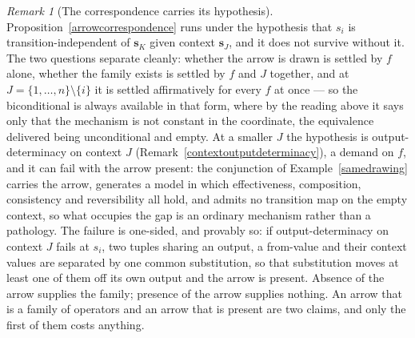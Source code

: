 \documentclass{article}
\theoremstyle{definition}
\theoremstyle{remark}
\newtheorem{remark}[proposition]{Remark}
\begin{document}
\begin{remark}[The correspondence carries its hypothesis]
\label{arrownotequivalence}
Proposition~\ref{arrowcorrespondence} runs under the hypothesis that $s_i$ is transition-independent of $\boldsymbol{s}_K$ given context $\boldsymbol{s}_J$, and it does not survive without it. The two questions separate cleanly: whether the arrow is drawn is settled by $f$ alone, whether the family exists is settled by $f$ and $J$ together, and at $J = \{1, \ldots, n\} \setminus \{i\}$ it is settled affirmatively for every $f$ at once --- so the biconditional is always available in that form, where by the reading above it says only that the mechanism is not constant in the coordinate, the equivalence delivered being unconditional and empty. At a smaller $J$ the hypothesis is output-determinacy on context $J$ (Remark~\ref{contextoutputdeterminacy}), a demand on $f$, and it can fail with the arrow present: the conjunction of Example~\ref{samedrawing} carries the arrow, generates a model in which effectiveness, composition, consistency and reversibility all hold, and admits no transition map on the empty context, so what occupies the gap is an ordinary mechanism rather than a pathology. The failure is one-sided, and provably so: if output-determinacy on context $J$ fails at $s_i$, two tuples sharing an output, a from-value and their context values are separated by one common substitution, so that substitution moves at least one of them off its own output and the arrow is present. Absence of the arrow supplies the family; presence of the arrow supplies nothing. An arrow that is a family of operators and an arrow that is present are two claims, and only the first of them costs anything.
\end{remark}
\end{document}
